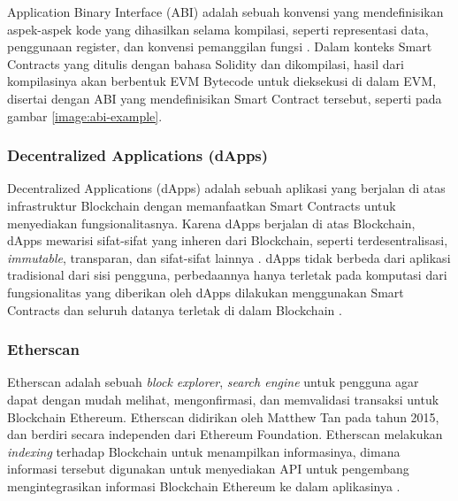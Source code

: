 Application Binary Interface (ABI) adalah sebuah konvensi yang mendefinisikan aspek-aspek kode yang dihasilkan selama kompilasi, seperti representasi data, penggunaan register, dan konvensi pemanggilan fungsi \parencite{sciencedirect2024}. Dalam konteks Smart Contracts yang ditulis dengan bahasa Solidity dan dikompilasi, hasil dari kompilasinya akan berbentuk EVM Bytecode untuk dieksekusi di dalam EVM, disertai dengan ABI yang mendefinisikan Smart Contract tersebut, seperti pada gambar \ref{image:abi-example}.

\subsubsection{Decentralized Applications (dApps)}
\label{subsubsec:dapps}

Decentralized Applications (dApps) adalah sebuah aplikasi yang berjalan di atas infrastruktur Blockchain dengan memanfaatkan Smart Contracts untuk menyediakan fungsionalitasnya. Karena dApps berjalan di atas Blockchain, dApps mewarisi sifat-sifat yang inheren dari Blockchain, seperti terdesentralisasi, \textit{immutable}, transparan, dan sifat-sifat lainnya \parencite{investopedia2024}. dApps tidak berbeda dari aplikasi tradisional dari sisi pengguna, perbedaannya hanya terletak pada komputasi dari fungsionalitas yang diberikan oleh dApps dilakukan menggunakan Smart Contracts dan seluruh datanya terletak di dalam Blockchain \parencite{metcalfe2020ethereum}. 

\subsubsection{Etherscan}
\label{subsubsec:etherscan}

Etherscan adalah sebuah \textit{block explorer}, \textit{search engine} untuk pengguna agar dapat dengan mudah melihat, mengonfirmasi, dan memvalidasi transaksi untuk Blockchain Ethereum. Etherscan didirikan oleh Matthew Tan pada tahun 2015, dan berdiri secara independen dari Ethereum Foundation. Etherscan melakukan \textit{indexing} terhadap Blockchain untuk menampilkan informasinya, dimana informasi tersebut digunakan untuk menyediakan API untuk pengembang mengintegrasikan informasi Blockchain Ethereum ke dalam aplikasinya \parencite{etherscan2024}.